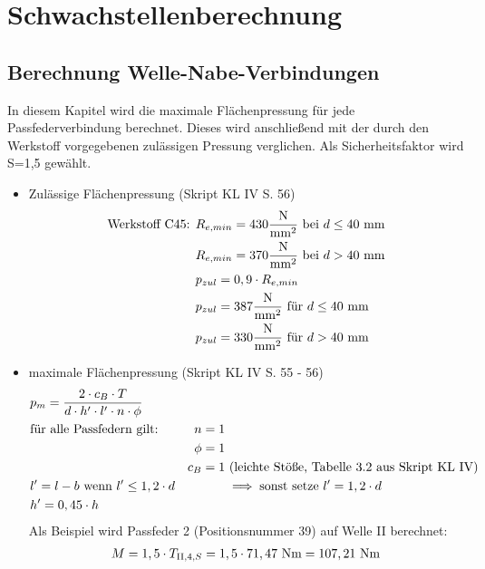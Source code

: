\chapter{Schwachstellenberechnung}
\section{Berechnung Welle-Nabe-Verbindungen}
In diesem Kapitel wird die maximale Flächenpressung für jede Passfederverbindung berechnet. Dieses wird anschließend mit der durch den Werkstoff vorgegebenen zulässigen Pressung verglichen. Als Sicherheitsfaktor wird S=1,5 gewählt.\\
\begin{itemize}
	\item Zulässige Flächenpressung \hfill  (Skript KL IV S. 56)
	\begin{align*}
		\text{Werkstoff C45: } &R_{e,min} = 430 \frac{\text{N}}{\text{mm}^2} \text{ bei } d\le 40 \text{ mm} \\
		 &R_{e,min} = 370 \frac{\text{N}}{\text{mm}^2} \text{ bei } d> 40 \text{ mm} \\
		 &p_{zul} = 0,9 \cdot R_{e,min}  \\
		 &p_{zul} = 387 \frac{\text{N}}{\text{mm}^2} \text{ für } d\le 40 \text{ mm} \\
		  &p_{zul} = 330 \frac{\text{N}}{\text{mm}^2} \text{ für } d> 40 \text{ mm} \\
	\end{align*}
	\item maximale Flächenpressung \hfill (Skript KL IV S. 55 - 56)
	\begin{align*}
		&p_m = \frac{2 \cdot c_B \cdot T}{d \cdot h' \cdot l' \cdot n \cdot \phi} && \\
		&\text{für alle Passfedern gilt: } &n=1 & \\
		& &\phi = 1& \\
		& &c_B = 1 &\text{ (leichte Stöße, Tabelle 3.2 aus Skript KL IV)}\\
		& l' = l - b \text{ wenn } l'\le 1,2 \cdot d &&\implies \text{sonst setze } l' = 1,2 \cdot d \\
		&h' = 0,45 \cdot h &&\\
	\end{align*}
	Als Beispiel wird Passfeder 2 (Positionsnummer 39) auf Welle II berechnet:
	\begin{align*}
		&M= 1,5 \x T_{\mathord{\mathrm{II}},4,S} = 1,5 \x  71,47\text{ Nm} = 107,21 \text{ Nm} \\

\end{align*}
\end{itemize}
